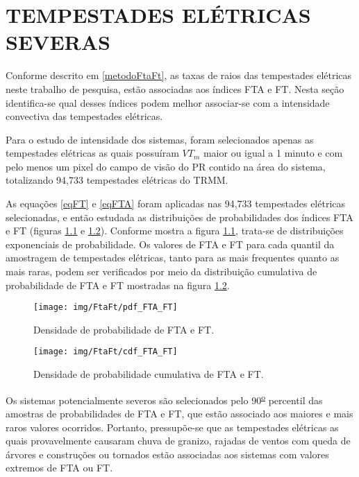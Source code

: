 \chapter{TEMPESTADES ELÉTRICAS SEVERAS}

Conforme descrito em \ref{metodoFtaFt}, as taxas de raios das tempestades elétricas neste trabalho de pesquisa, estão associadas aos índices FTA e FT.  Nesta seção identifica-se qual desses índices podem melhor associar-se com a intensidade convectiva das tempestades elétricas.%

Para o estudo de intensidade dos sistemas, foram selecionados apenas as tempestades elétricas as quais possuíram $VT_m$ maior ou igual a 1 minuto e com pelo menos um pixel do campo de visão do PR contido na área do sistema, totalizando 94,733 tempestades elétricas do TRMM. %

As equações \ref{eqFT} e \ref{eqFTA} foram aplicadas nas 94,733 tempestades elétricas selecionadas, e então estudada as distribuições de probabilidades dos índices FTA e FT (figuras \ref{pdfFTAFT} e \ref{cdfFTAFT}). Conforme mostra a figura \ref{pdfFTAFT}, trata-se de distribuições exponenciais de probabilidade. Os valores de FTA e FT para cada quantil da amostragem de tempestades elétricas, tanto para as mais frequentes quanto as mais raras, podem ser verificados por meio da distribuição cumulativa de probabilidade de FTA e FT mostradas na figura \ref{cdfFTAFT}. 

\begin{figure}[!ht]
  \centering
  \texttt{[image: img/FtaFt/pdf\_FTA\_FT]}      
  \caption{Densidade de probabilidade de FTA e FT.} 
   \label{pdfFTAFT} 
\end{figure}

\begin{figure}[!ht]
  \centering 
  \texttt{[image: img/FtaFt/cdf\_FTA\_FT]} 
  \caption{Densidade de probabilidade cumulativa de FTA e FT.}
  \label{cdfFTAFT}
\end{figure}

Os sistemas potencialmente severos são selecionados pelo 90\textsuperscript{\underline{o}} percentil das amostras de probabilidades de FTA e FT, que estão associado aos maiores e mais raros valores ocorridos. Portanto, pressupõe-se que as tempestades elétricas as quais provavelmente causaram chuva de granizo, rajadas de ventos com queda de árvores e construções ou tornados estão associadas aos sistemas com valores extremos de FTA ou FT.

